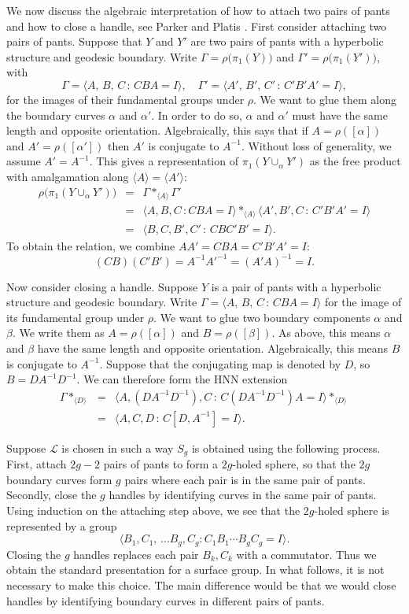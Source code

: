 \documentclass[11pt]{amsart}
\numberwithin{equation}{section}
\begin{document}
We now discuss the algebraic interpretation of how to attach two pairs of pants and how to close a handle, see 
Parker and Platis \cite{PP}. First consider attaching two pairs of pants. 
Suppose that $Y$ and $Y'$ are two pairs of pants with a hyperbolic structure and geodesic boundary. 
Write $\Gamma=\rho\bigl(\pi_1(Y)\bigr)$ and $\Gamma'=\rho\bigl(\pi_1(Y')\bigr)$, with 
$$
\Gamma=\langle A,\,B,\,C\,:\,CBA=I\rangle, \quad 
\Gamma'=\langle A',\,B',\,C'\,:\,C'B'A'=I\rangle,
$$ 
for the images of their fundamental groups under $\rho$. We want to glue them along 
the boundary curves $\alpha$ and $\alpha'$. In order to do so, $\alpha$ and $\alpha'$ must have the same length and 
opposite orientation. Algebraically, this says that if $A=\rho([\alpha])$ and $A'=\rho([\alpha'])$ then $A'$ is conjugate to
$A^{-1}$. Without loss of generality, we assume $A'=A^{-1}$. This gives a representation of $\pi_1(Y\cup_\alpha Y')$ as 
the free product with amalgamation along $\langle A\rangle=\langle A'\rangle$:
\begin{eqnarray*}
\rho\bigl(\pi_1(Y\cup_\alpha Y')\bigr)
& = & \Gamma *_{\langle A\rangle} \Gamma' \\
& = & \langle A,B,C\,:CBA=I\rangle *_{\langle A\rangle}\langle A',B',C\,:\,C'B'A'=I\rangle \\
& = & \langle B,C,B',C'\,:\, CBC'B'=I\rangle.
\end{eqnarray*}
To obtain the relation, we combine $AA'=CBA=C'B'A'=I$:
$$
(CB)(C'B')=A^{-1}{A'}^{-1}=(A'A)^{-1}=I.
$$

Now consider closing a handle. Suppose $Y$ is a pair of pants
with a hyperbolic structure and geodesic boundary. Write $\Gamma=\langle A,\,B,\,C\,:\,CBA=I\rangle$ for
the image of its fundamental group under $\rho$. We want to glue two boundary components $\alpha$ and $\beta$. 
We write them as $A=\rho([\alpha])$ and $B=\rho([\beta])$.  
As above, this means $\alpha$ and $\beta$ have the same length and opposite orientation. Algebraically, this
means $B$ is conjugate to $A^{-1}$. Suppose that the conjugating map is denoted by $D$, so
$B=DA^{-1}D^{-1}$. We can therefore form the HNN extension
\begin{eqnarray*}
\Gamma *_{\langle D\rangle}
& = & \langle A,(DA^{-1}D^{-1}),C\,:\, C(DA^{-1}D^{-1})A=I\rangle *_{\langle D\rangle} \\
& = & \langle A,C,D\,:\, C[D,A^{-1}]=I\rangle.
\end{eqnarray*}

Suppose ${\mathcal L}$ is chosen in such a way $S_g$ is obtained using the following process. First, attach 
$2g-2$ pairs of pants to form a $2g$-holed sphere, so that the $2g$ boundary curves form $g$ pairs where each pair is in the
same pair of pants. Secondly, close the $g$ handles by identifying curves in the same pair of pants. Using induction
on the attaching step above, we see that the $2g$-holed sphere is represented by a group 
$$
\langle B_1,C_1,\,\ldots B_g,C_g : C_1B_1\cdots B_gC_g=I\rangle.
$$
Closing the $g$ handles replaces each pair $B_k,C_k$ with a commutator. Thus we obtain the standard presentation 
for a surface group. In what follows, it is not necessary to make this choice. The main difference would be that we would close
handles by identifying boundary curves in different pairs of pants. 
\end{document}
